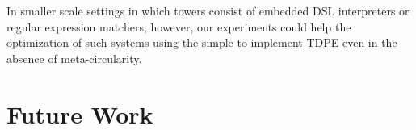 \documentclass[a4paper,12pt,twoside,openright]{report}
\theoremstyle{definition}
\begin{document}
In smaller scale settings in which towers consist of embedded DSL interpreters or regular expression matchers, however, our experiments could help the optimization of such systems using the simple to implement TDPE even in the absence of meta-circularity.

\section{Future Work}\label{sec:future}

\end{document}
